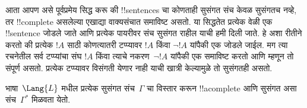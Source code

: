 \documentclass[../../../include/open-logic-section]{subfiles}
\begin{document}
      {}
      {}


\begin{explain}
आता आपण असे पूर्वप्रमेय सिद्ध करू की !!{sentence}s चा कोणताही सुसंगत
संच केवळ सुसंगतच नव्हे, तर !!{complete} असलेल्या एखाद्या वाक्यसंचात
समाविष्ट असतो. या सिद्धतेत प्रत्येक वेळी एक !!{sentence} जोडले जाते
आणि प्रत्येक पायरीवर संच सुसंगत राहील याची हमी दिली जाते. हे अशा रीतीने
करतो की प्रत्येक $!A$ साठी कोणत्यातरी टप्प्यावर $!A$ किंवा $\lnot
!A$ यांपैकी एक जोडले जाईल. मग त्या रचनेतील सर्व टप्प्यांचा संघ $!A$
किंवा त्याचे नकरण~$\lnot !A$ यांपैकी एक समाविष्ट करतो आणि म्हणून तो
संपूर्ण असतो. प्रत्येक टप्प्यावर विसंगती येणार नाही याची खात्री केल्यामुळे
तो सुसंगतही असतो.
\end{explain}

\begin{lem}[लिंडेनबाउमचे पूर्वप्रमेय]
 भाषा~$\Lang{L}$ मधील प्रत्येक सुसंगत
संच~$\Gamma$ चा विस्तार करून !!a{complete} आणि सुसंगत असा
संच~$\Gamma^*$ मिळवता येतो.
\end{lem}
\end{document}
